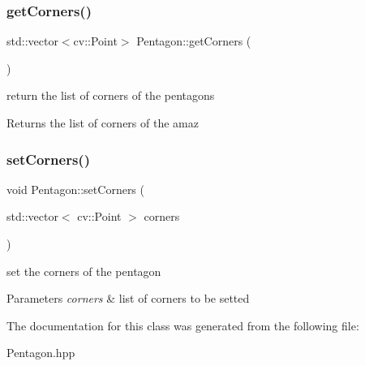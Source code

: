 \subsubsection{\texorpdfstring{get\+Corners()}{getCorners()}}
{\footnotesize\ttfamily std\+::vector$<$cv\+::\+Point$>$ Pentagon\+::get\+Corners (\begin{DoxyParamCaption}{ }\end{DoxyParamCaption})}

return the list of corners of the pentagons \begin{DoxyReturn}{Returns}
the list of corners of the amaz 
\end{DoxyReturn}
\mbox{\label{class_pentagon_a42c8df4cbb1fcf985c96c9886a21c70a}} 
\subsubsection{\texorpdfstring{set\+Corners()}{setCorners()}}
{\footnotesize\ttfamily void Pentagon\+::set\+Corners (\begin{DoxyParamCaption}\item[{std\+::vector$<$ cv\+::\+Point $>$}]{corners }\end{DoxyParamCaption})}

set the corners of the pentagon 
\begin{DoxyParams}{Parameters}
{\em corners} & list of corners to be setted \\
\hline
\end{DoxyParams}


The documentation for this class was generated from the following file\+:\begin{DoxyCompactItemize}
\item 
Pentagon.\+hpp\end{DoxyCompactItemize}
